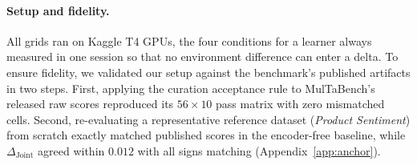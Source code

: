 \documentclass{article}
\begin{document}
\paragraph{Setup and fidelity.} All grids ran on Kaggle \cite{kaggle} T4 GPUs, the four conditions for a
learner always measured in one session so that no environment difference can enter a delta.
To ensure fidelity, we validated our setup against the benchmark's published artifacts in two steps. First, applying the curation acceptance rule to MulTaBench's released raw scores reproduced its $56 \times 10$ pass matrix with zero mismatched cells. Second, re-evaluating a representative reference dataset (\emph{Product Sentiment}) from scratch exactly matched published scores in the encoder-free baseline, while $\Delta_{\text{Joint}}$ agreed within $0.012$ with all signs matching (Appendix~\ref{app:anchor}).
\end{document}
